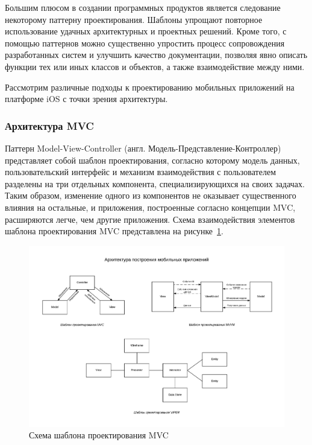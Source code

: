 Большим плюсом в создании программных продуктов является следование некоторому
паттерну проектирования. Шаблоны упрощают повторное использование удачных
архитектурных и проектных решений.
Кроме того, с помощью паттернов можно существенно
упростить процесс сопровождения разработанных систем и улучшить
качество документации, позволяя явно описать функции тех или иных
классов и объектов, а также взаимодействие между ними.

Рассмотрим различные подходы к проектированию мобильных приложений на платформе
iOS с точки зрения архитектуры.



\subsubsection{Архитектура MVC}

Паттерн Model-View-Controller (англ. Модель-Представление-Контроллер) представляет
собой шаблон проектирования, согласно которому модель данных,
пользовательский интерфейс и механизм взаимодействия с пользователем разделены
на три отдельных компонента, специализирующихся на своих задачах.
Таким образом, изменение одного из компонентов не оказывает существенного
влияния на остальные, и приложения, построенные согласно концепции MVC,
расширяются легче, чем другие приложения.
Схема взаимодействия элементов шаблона проектирования MVC
представлена на рисунке~\ref{fig:mvc}.
\begin{figure}[h!]
  \centering
  \includegraphics[width=140mm]{fig/mvc}
  \caption{Схема шаблона проектирования MVC}
  \label{fig:mvc}
\end{figure}

